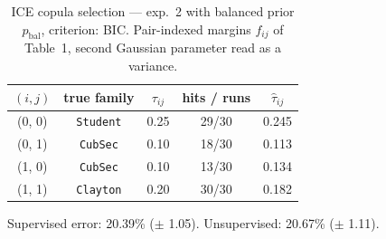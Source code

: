 \begin{table}[htbp]
  \centering
  \caption{ICE copula selection — exp.\ 2 with balanced prior $p_{\text{bal}}$, criterion: BIC. Pair-indexed margins $f_{ij}$ of Table~1, second Gaussian parameter read as a variance.}
  \label{tab:exp3-exp2_bal_p__bic}
  \begin{tabular}{ccccc}
    \toprule
    $(i, j)$ & true family & $\tau_{ij}$ & hits / runs & $\hat\tau_{ij}$ \\
    \midrule
    (0, 0) & \texttt{Student} & 0.25 & 29/30 & 0.245 \\
    (0, 1) & \texttt{CubSec} & 0.10 & 18/30 & 0.113 \\
    (1, 0) & \texttt{CubSec} & 0.10 & 13/30 & 0.134 \\
    (1, 1) & \texttt{Clayton} & 0.20 & 30/30 & 0.182 \\
    \bottomrule
  \end{tabular}
  \par\smallskip Supervised error: 20.39\% ($\pm$ 1.05). Unsupervised: 20.67\% ($\pm$ 1.11).
\end{table}
